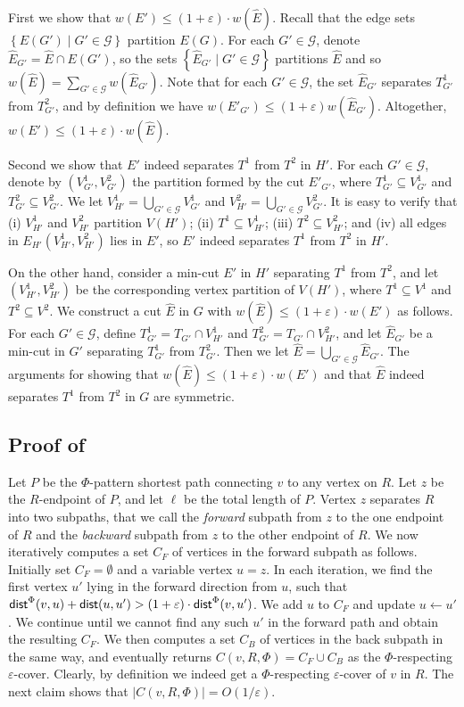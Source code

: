 \documentclass[11pt]{article}
\theoremstyle{definition}
\newcommand{\set}[1]{\left\{ #1 \right\}}
\newcommand{\gset}{{\mathcal{G}}}
\newcommand{\eps}{{\varepsilon}}
\newcommand{\dist}{\textnormal{\textsf{dist}}}
\newcounter{note}
\begin{document}
First we show that $w(E')\le (1+\eps)\cdot w(\hat E)$.
Recall that the edge sets $\set{E(G')\mid G'\in \gset}$ partition $E(G)$. For each $G'\in \gset$, denote $\hat E_{G'}=\hat E\cap E(G')$, so the sets $\set{\hat E_{G'} \mid G'\in \gset}$ partitions $\hat E$ and so $w(\hat E)=\sum_{G'\in \gset}w(\hat E_{G'})$.
Note that for each $G'\in \gset$, the set $\hat E_{G'}$ separates $T^1_{G'}$ from $T^2_{G'}$, and by definition we have $w(E'_{G'})\le (1+\eps) w(\hat E_{G'})$. Altogether, $w(E')\le (1+\eps)\cdot w(\hat E)$.

Second we show that $E'$ indeed separates $T^1$ from $T^2$ in $H'$. For each $G'\in \gset$, denote by $(V^1_{G'},V^2_{G'})$ the partition formed by the cut $E'_{G'}$, where $T^1_{G'}\subseteq V^1_{G'}$ and $T^2_{G'}\subseteq V^2_{G'}$. We let $V^1_{H'}=\bigcup_{G'\in \gset}V^1_{G'}$ and $V^2_{H'}=\bigcup_{G'\in \gset}V^2_{G'}$.
It is easy to verify that (i) $V^1_{H'}$ and $V^2_{H'}$ partition $V(H')$; (ii) $T^1\subseteq V^1_{H'}$; (iii) $T^2\subseteq V^2_{H'}$; and (iv) all edges in $E_{H'}(V^1_{H'},V^2_{H'})$ lies in $E'$, so $E'$ indeed separates $T^1$ from $T^2$ in $H'$.

On the other hand, consider a min-cut $E'$ in $H'$ separating $T^1$ from $T^2$, and let $(V_{H'}^1,V_{H'}^2)$ be the corresponding vertex partition of $V(H')$, where $T^1\subseteq V^1$ and $T^2\subseteq V^2$. 
We construct a cut $\hat E$ in $G$ with $w(\hat E)\le (1+\eps)\cdot w(E')$ as follows. 
For each $G'\in \gset$, define $T^1_{G'}=T_{G'}\cap V^1_{H'}$ and $T^2_{G'}=T_{G'}\cap V^2_{H'}$, and let $\hat E_{G'}$ be a min-cut in $G'$ separating $T^1_{G'}$ from $T^2_{G'}$. 
Then we let $\hat E=\bigcup_{G'\in \gset}\hat E_{G'}$.
The arguments for showing that $w(\hat E)\le (1+\eps)\cdot w(E')$ and that $\hat E$ indeed separates $T^1$ from $T^2$ in $G$ are symmetric.

\subsection{Proof of }
\label{apd: Proof of lem: pattern cover}

Let $P$ be the $\Phi$-pattern shortest path connecting $v$ to any vertex on $R$. Let $z$ be the $R$-endpoint of $P$, and let $\ell$ be the total length of $P$.
Vertex $z$ separates $R$ into two subpaths, that we call the \emph{forward} subpath from $z$ to the one endpoint of $R$ and the \emph{backward} subpath from $z$ to the other endpoint of $R$.
We now iteratively computes a set $C_F$ of vertices in the forward subpath as follows.
Initially set $C_F=\emptyset$ and a variable vertex $u=z$. In each iteration, we find the first vertex $u'$ lying in the forward direction from $u$, such that 
$\dist^{\Phi}(v,u)+\dist(u,u')> (1+\eps)\cdot \dist^{\Phi}(v,u')$. We add $u$ to $C_F$ and update $u\leftarrow u'$. We continue until we cannot find any such $u'$ in the forward path and obtain the resulting $C_F$.
We then computes a set $C_B$ of vertices in the back subpath in the same way, and eventually returns $C(v,R,\Phi)=C_F\cup C_B$ as the $\Phi$-respecting $\eps$-cover.
Clearly, by definition we indeed get a $\Phi$-respecting $\eps$-cover of $v$ in $R$. The next claim shows that $|C(v,R,\Phi)|=O(1/\eps)$.
\end{document}
